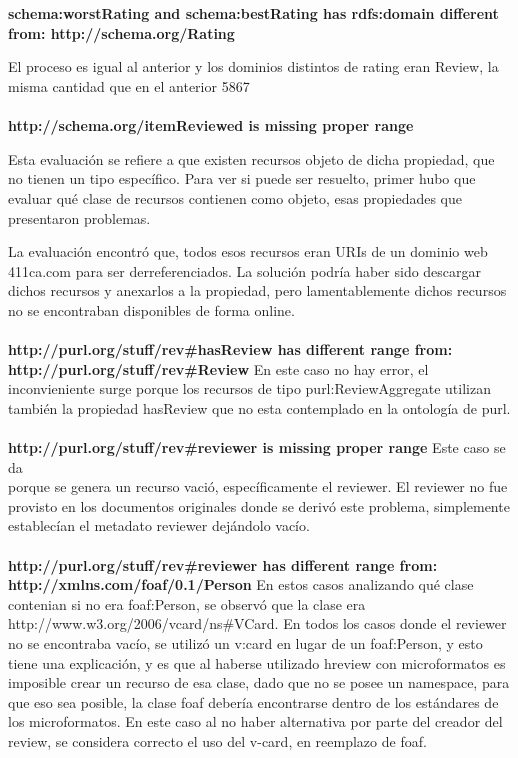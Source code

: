 ~\\\\


\textbf{\noindent schema:worstRating and schema:bestRating has rdfs:domain different from: http://schema.org/Rating}

El proceso es igual al anterior y los dominios distintos de rating eran Review, la misma cantidad que en el anterior 5867
\\\\

\textbf{http://schema.org/itemReviewed is missing proper range}

Esta evaluación se refiere a que existen recursos objeto de dicha propiedad, que no tienen un tipo específico. Para ver si 
puede ser resuelto, primer hubo que evaluar qué clase de recursos contienen como objeto, esas propiedades que presentaron problemas.

La evaluación encontró que, todos esos recursos eran URIs de un dominio web 411ca.com para ser derreferenciados. La solución podría haber sido 
descargar dichos recursos y anexarlos a la propiedad, pero lamentablemente dichos recursos no se encontraban disponibles de forma online.
\\\\
\textbf{http://purl.org/stuff/rev\#hasReview has different range from:\\\noindent http://purl.org/stuff/rev\#Review }
En este caso no hay error, el inconvieniente surge porque los recursos de tipo purl:ReviewAggregate utilizan también la propiedad hasReview
que no esta contemplado en la ontología de purl.
\\\\
\textbf{http://purl.org/stuff/rev\#reviewer is missing proper range}
Este caso se da \\\noindent porque se genera un recurso vació, específicamente el reviewer. El reviewer no fue provisto en los documentos originales donde 
se derivó este problema, simplemente establecían el metadato reviewer dejándolo vacío.
\\\\
\textbf{http://purl.org/stuff/rev\#reviewer has different range from:\\\noindent http://xmlns.com/foaf/0.1/Person}
En estos casos analizando qué clase contenian si no era foaf:Person, se observó que la clase era \\\noindent http://www.w3.org/2006/vcard/ns\#VCard.
En todos los casos donde el reviewer no se encontraba vacío, se utilizó un v:card en lugar de un foaf:Person, y esto tiene una explicación, 
y es que al haberse utilizado hreview con microformatos es imposible crear un recurso de esa clase, dado que no se posee un namespace, para que 
eso sea posible, la clase foaf debería encontrarse dentro de los estándares de los microformatos. 
En este caso al no haber alternativa por parte del creador del review, se considera correcto el uso del v-card, en reemplazo de foaf.

